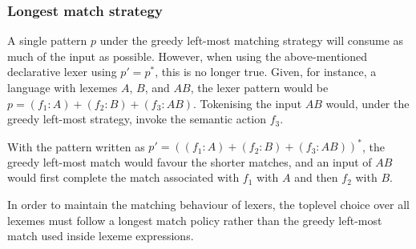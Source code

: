 \subsubsection{Longest match strategy}

A single pattern $p$ under the greedy left-most matching strategy will consume
as much of the input as possible. However, when using the above-mentioned
declarative lexer using $p' = p^*$, this is no longer true. Given, for instance,
a language with lexemes $A$, $B$, and $AB$, the lexer pattern would be $p =
(f_1:A) + (f_2:B) + (f_3:AB)$. Tokenising the input $AB$ would, under the greedy
left-most strategy, invoke the semantic action $f_3$.

With the pattern written as $p' = ((f_1:A) + (f_2:B) + (f_3:AB))^*$, the greedy
left-most match would favour the shorter matches, and an input of $AB$ would
first complete the match associated with $f_1$ with $A$ and then $f_2$ with $B$.

In order to maintain the matching behaviour of lexers, the toplevel choice over
all lexemes must follow a longest match policy rather than the greedy left-most
match used inside lexeme expressions.


